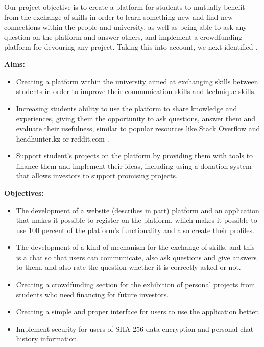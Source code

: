 Our project objective is to create a platform for students to mutually benefit from the exchange of skills in order to learn something new and find new connections within the people and university, as well as being able to ask any question on the platform and answer others, and implement a crowdfunding platform \cite{crowdfunding} for devouring any project. Taking this into account, we next identified .

\vspace{0.5cm}
\par
\textbf{Aims:}
\begin{itemize}
  \item Creating a platform within the university aimed at exchanging skills between students in order to improve their communication skills and technique skills.
  \item Increasing students ability to use the platform to share knowledge and experiences, giving them the opportunity to ask questions, answer them and evaluate their usefulness, similar to popular resources like Stack Overflow \cite{stackoverlow} and headhunter.kz \cite{headhunter} or reddit.com \cite{reddit}.
  \item Support student’s projects on the platform by providing them with tools to finance them and implement their ideas, including using a donation system that allows investors to support promising projects.
\end{itemize}

\textbf{Objectives:}
\begin{itemize}
\par
  \item The development of a website (describes in  part) platform and an application  that makes it possible to register on the platform, which makes it possible to use 100 percent of the platform's functionality and also create their profiles.
  \item The development of a kind of mechanism for the exchange of skills, and this is a chat so that users can communicate, also ask questions and give answers to them, and also rate the question whether it is correctly asked or not.
  \item Creating a crowdfunding \cite{crowdfunding} section for the exhibition of personal projects from students who need financing for future investors.
  \item Creating a simple and proper interface for users to use the application better.
  \item Implement security for users of SHA-256 data encryption and personal chat history information.  
\end{itemize}

